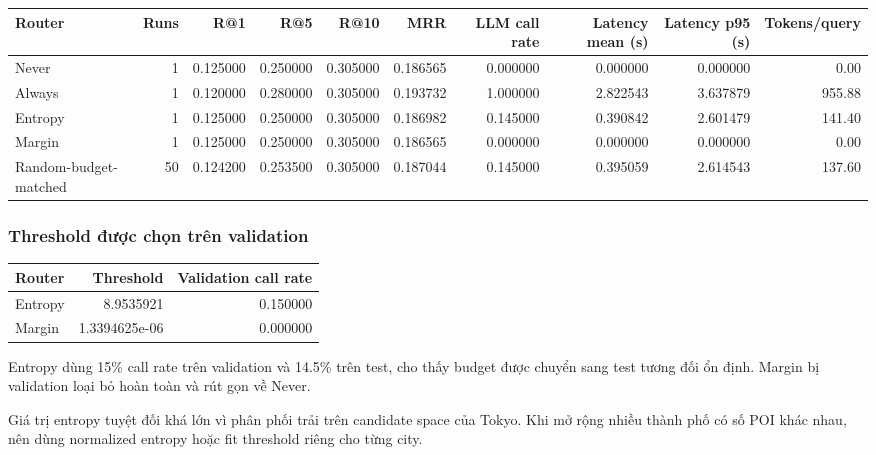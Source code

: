 \begin{table}[!htbp]
\centering
\scriptsize
\setlength{\tabcolsep}{2.5pt}
\begin{adjustbox}{max width=\textwidth}
\begin{tabular}{@{}lrrrrrrrrr@{}}
\toprule
Router & Runs & R@1 & R@5 & R@10 & MRR & LLM call rate & Latency mean (s) & Latency p95 (s) & Tokens/query \\
\midrule
Never & 1 & 0.125000 & 0.250000 & 0.305000 & 0.186565 & 0.000000 & 0.000000 & 0.000000 & 0.00 \\
Always & 1 & 0.120000 & 0.280000 & 0.305000 & 0.193732 & 1.000000 & 2.822543 & 3.637879 & 955.88 \\
Entropy & 1 & 0.125000 & 0.250000 & 0.305000 & 0.186982 & 0.145000 & 0.390842 & 2.601479 & 141.40 \\
Margin & 1 & 0.125000 & 0.250000 & 0.305000 & 0.186565 & 0.000000 & 0.000000 & 0.000000 & 0.00 \\
Random-budget-matched & 50 & 0.124200 & 0.253500 & 0.305000 & 0.187044 & 0.145000 & 0.395059 & 2.614543 & 137.60 \\
\bottomrule
\end{tabular}
\end{adjustbox}
\end{table}

\subsubsection*{Threshold được chọn trên validation}

\begin{table}[!htbp]
\centering
\scriptsize
\setlength{\tabcolsep}{2.5pt}
\begin{adjustbox}{max width=\textwidth}
\begin{tabular}{@{}lrr@{}}
\toprule
Router & Threshold & Validation call rate \\
\midrule
Entropy & 8.9535921 & 0.150000 \\
Margin & 1.3394625e-06 & 0.000000 \\
\bottomrule
\end{tabular}
\end{adjustbox}
\end{table}

Entropy dùng 15\% call rate trên validation và 14.5\% trên test, cho thấy budget được chuyển sang test tương đối ổn định. Margin bị validation loại bỏ hoàn toàn và rút gọn về Never.

Giá trị entropy tuyệt đối khá lớn vì phân phối trải trên candidate space của Tokyo. Khi mở rộng nhiều thành phố có số POI khác nhau, nên dùng normalized entropy  hoặc fit threshold riêng cho từng city.

